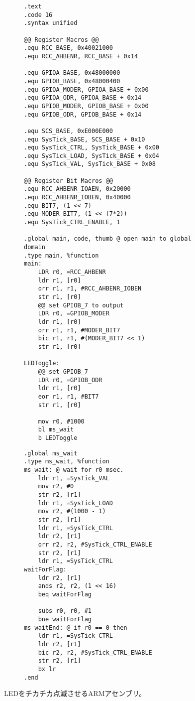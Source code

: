 \documentclass[uplatex]{jsarticle}
\begin{document}
\begin{figure}[H]
\begin{multicols}{2}
	\begin{figure}[H]
		\begin{lstlisting}[style=armasm]
.text
.code 16
.syntax unified

@@ Register Macros @@
.equ RCC_BASE, 0x40021000
.equ RCC_AHBENR, RCC_BASE + 0x14

.equ GPIOA_BASE, 0x48000000
.equ GPIOB_BASE, 0x48000400
.equ GPIOA_MODER, GPIOA_BASE + 0x00
.equ GPIOA_ODR, GPIOA_BASE + 0x14
.equ GPIOB_MODER, GPIOB_BASE + 0x00
.equ GPIOB_ODR, GPIOB_BASE + 0x14

.equ SCS_BASE, 0xE000E000
.equ SysTick_BASE, SCS_BASE + 0x10
.equ SysTick_CTRL, SysTick_BASE + 0x00
.equ SysTick_LOAD, SysTick_BASE + 0x04
.equ SysTick_VAL, SysTick_BASE + 0x08

@@ Register Bit Macros @@
.equ RCC_AHBENR_IOAEN, 0x20000
.equ RCC_AHBENR_IOBEN, 0x40000
.equ BIT7, (1 << 7)
.equ MODER_BIT7, (1 << (7*2))
.equ SysTick_CTRL_ENABLE, 1

.global main, code, thumb @ open main to global domain
.type main, %function
main:
	LDR r0, =RCC_AHBENR
	ldr r1, [r0]
	orr r1, r1, #RCC_AHBENR_IOBEN
	str r1, [r0]
	@@ set GPIOB_7 to output
	LDR r0, =GPIOB_MODER
	ldr r1, [r0]
	orr r1, r1, #MODER_BIT7
	bic r1, r1, #(MODER_BIT7 << 1)
	str r1, [r0]

LEDToggle:
	@@ set GPIOB_7
	LDR r0, =GPIOB_ODR
	ldr r1, [r0]
	eor r1, r1, #BIT7
	str r1, [r0]

	mov r0, #1000
	bl ms_wait
	b LEDToggle
		\end{lstlisting}
	\end{figure}
	\begin{figure}[H]
		\begin{lstlisting}[style=armasm,firstnumber=53]
.global ms_wait
.type ms_wait, %function
ms_wait: @ wait for r0 msec.
	ldr r1, =SysTick_VAL
	mov r2, #0
	str r2, [r1]
	ldr r1, =SysTick_LOAD
	mov r2, #(1000 - 1)
	str r2, [r1]
	ldr r1, =SysTick_CTRL
	ldr r2, [r1]
	orr r2, r2, #SysTick_CTRL_ENABLE
	str r2, [r1]
	ldr r1, =SysTick_CTRL
waitForFlag:
	ldr r2, [r1]
	ands r2, r2, (1 << 16)
	beq waitForFlag

	subs r0, r0, #1
	bne waitForFlag
ms_waitEnd: @ if r0 == 0 then
	ldr r1, =SysTick_CTRL
	ldr r2, [r1]
	bic r2, r2, #SysTick_CTRL_ENABLE
	str r2, [r1]
	bx lr
.end
		\end{lstlisting}
	\end{figure}
\end{multicols}
\caption{LEDをチカチカ点滅させるARMアセンブリ。}
\end{figure}
\end{document}
